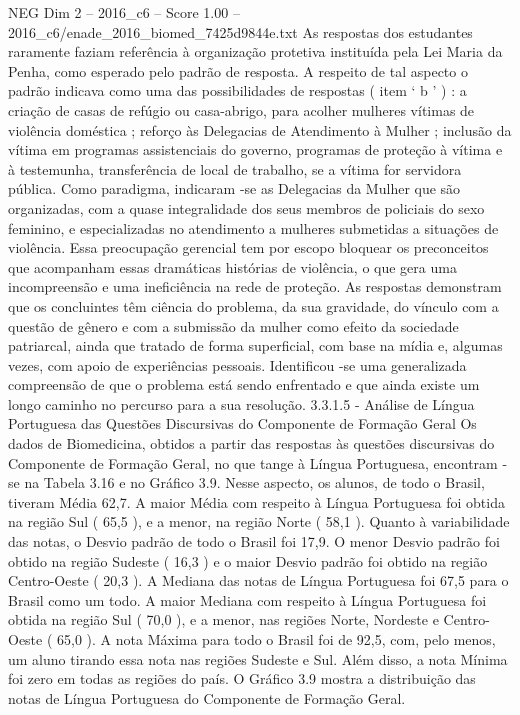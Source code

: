 \begin{textsample}{NEG Dim 2 – 2016\_c6 – Score 1.00 – 2016\_c6/enade\_2016\_biomed\_7425d9844e.txt}
As respostas dos estudantes raramente faziam referência à organização protetiva instituída pela Lei Maria da Penha, como esperado pelo padrão de resposta.
A respeito de tal aspecto o padrão indicava como uma das possibilidades de respostas ( item ‘ b ’ ) : a criação de casas de refúgio ou casa-abrigo, para acolher mulheres vítimas de violência doméstica ; reforço às Delegacias de Atendimento à Mulher ; inclusão da vítima em programas assistenciais do governo, programas de proteção à vítima e à testemunha, transferência de local de trabalho, se a vítima for servidora pública.
Como paradigma, indicaram -se as Delegacias da Mulher que são organizadas, com a quase integralidade dos seus membros de policiais do sexo feminino, e especializadas no atendimento a mulheres submetidas a situações de violência.
Essa preocupação gerencial tem por escopo bloquear os preconceitos que acompanham essas dramáticas histórias de violência, o que gera uma incompreensão e uma ineficiência na rede de proteção.
As respostas demonstram que os concluintes têm ciência do problema, da sua gravidade, do vínculo com a questão de gênero e com a submissão da mulher como efeito da sociedade patriarcal, ainda que tratado de forma superficial, com base na mídia e, algumas vezes, com apoio de experiências pessoais.
Identificou -se uma generalizada compreensão de que o problema está sendo enfrentado e que ainda existe um longo caminho no percurso para a sua resolução. 3.3.1.5 - Análise de Língua Portuguesa das Questões Discursivas do Componente de Formação Geral Os dados de Biomedicina, obtidos a partir das respostas às questões discursivas do Componente de Formação Geral, no que tange à Língua Portuguesa, encontram -se na Tabela 3.16 e no Gráfico 3.9.
Nesse aspecto, os alunos, de todo o Brasil, tiveram Média 62,7.
A maior Média com respeito à Língua Portuguesa foi obtida na região Sul ( 65,5 ), e a menor, na região Norte ( 58,1 ).
Quanto à variabilidade das notas, o Desvio padrão de todo o Brasil foi 17,9.
O menor Desvio padrão foi obtido na região Sudeste ( 16,3 ) e o maior Desvio padrão foi obtido na região Centro-Oeste ( 20,3 ).
A Mediana das notas de Língua Portuguesa foi 67,5 para o Brasil como um todo.
A maior Mediana com respeito à Língua Portuguesa foi obtida na região Sul ( 70,0 ), e a menor, nas regiões Norte, Nordeste e Centro-Oeste ( 65,0 ).
A nota Máxima para todo o Brasil foi de 92,5, com, pelo menos, um aluno tirando essa nota nas regiões Sudeste e Sul.
Além disso, a nota Mínima foi zero em todas as regiões do país.
O Gráfico 3.9 mostra a distribuição das notas de Língua Portuguesa do Componente de Formação Geral.

\end{textsample}
